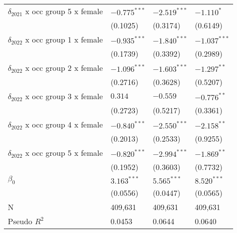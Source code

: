 \begin{tabular}{llll}
$\delta_{2021}$ x occ group 5 x female &  $-0.775^{***}$ &  $-2.519^{***}$ &      $-1.110^*$ \\
                                       &        (0.1025) &        (0.3174) &        (0.6149) \\
$\delta_{2022}$ x occ group 1 x female &  $-0.935^{***}$ &  $-1.840^{***}$ &  $-1.037^{***}$ \\
                                       &        (0.1739) &        (0.3392) &        (0.2989) \\
$\delta_{2022}$ x occ group 2 x female &  $-1.096^{***}$ &  $-1.603^{***}$ &   $-1.297^{**}$ \\
                                       &        (0.2716) &        (0.3628) &        (0.5207) \\
$\delta_{2022}$ x occ group 3 x female &         $0.314$ &        $-0.559$ &   $-0.776^{**}$ \\
                                       &        (0.2723) &        (0.5217) &        (0.3361) \\
$\delta_{2022}$ x occ group 4 x female &  $-0.840^{***}$ &  $-2.550^{***}$ &   $-2.158^{**}$ \\
                                       &        (0.2013) &        (0.2533) &        (0.9255) \\
$\delta_{2022}$ x occ group 5 x female &  $-0.820^{***}$ &  $-2.994^{***}$ &   $-1.869^{**}$ \\
                                       &        (0.1952) &        (0.3603) &        (0.7732) \\
$\beta_0$                              &   $3.163^{***}$ &   $5.565^{***}$ &   $8.520^{***}$ \\
                                       &        (0.0556) &        (0.0447) &        (0.0565) \\
N                                      &         409,631 &         409,631 &         409,631 \\
Pseudo $R^2$                           &          0.0453 &          0.0644 &          0.0640 \\
\bottomrule
\end{tabular}
